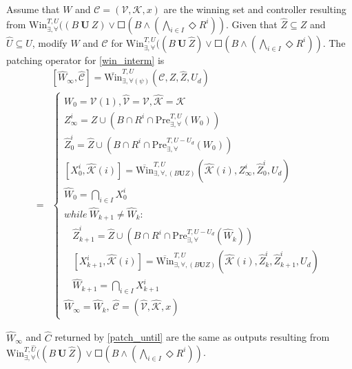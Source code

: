 Assume that $ W $ and $ \mathcal{C}=(\mathcal{V},\mathcal{K},x) $ are the winning set and controller resulting from $\text{Win}_{\exists,\forall}^{T,U}((B\mathbf{\ U\ }Z)\vee \Square(B\wedge (\bigwedge_{i\in I} \Diamond R^i)) $. Given that $ \widehat{Z}\subseteq Z $ and $ \widehat{U}\subseteq U $, modify $ W $ and $ \mathcal{C} $ for $\text{Win}_{\exists,\forall}^{T,U}((B\mathbf{\ U\ }\widehat{Z})\vee \Square(B\wedge (\bigwedge_{i\in I} \Diamond R^i)) $. The patching operator for \eqref{win_interm} is 
\begin{align}
&[\widehat{W}_{\infty},\widehat{\mathcal{C}}]=\overline{\text{Win}}^{T, U}_{\exists,\forall (\psi)} (\mathcal{C},Z,\widehat{Z},U_d)\\
=&\begin{cases}
W_0 = \mathcal{V}(1),\widehat{\mathcal{V}}=\mathcal{V},\widehat{\mathcal{K}}=\mathcal{K}\\
Z_{\infty}^i = Z\cup (B\cap R^i\cap \text{Pre}_{\exists, \forall}^{T,U}(W_0))\\
\widehat{Z}_{0}^i = \widehat{Z}\cup (B\cap R^i\cap \text{Pre}_{\exists, \forall}^{T,U-U_d}(W_0))\\
[X^i_0,\widehat{\mathcal{K}}(i)] = \overline{\text{Win}}^{T,U}_{\exists,\forall, (B\mathbf{U}Z)}(\widehat{\mathcal{K}}(i),Z_\infty^i,\widehat{Z}_0^i, U_d)\\
\widehat{W}_{0} = \bigcap_{i\in I} X^i_0\\
while\ \widehat{W}_{k+1}\not=\widehat{W}_k:\\
\ \ \ \ \widehat{Z}_{k+1}^i = \widehat{Z} \cup (B\cap R^i\cap \text{Pre}_{\exists, \forall}^{T,U-U_d}(\widehat{W}_k))\\
\ \ \ \ [X^i_{k+1},\widehat{\mathcal{K}}(i)]=\overline{\text{Win}}^{T,U}_{\exists,\forall,(B\mathbf{U}Z)}(\widehat{\mathcal{K}}(i),\widehat{Z}_k^i,\widehat{Z}_{k+1}^i, U_d)\\
\ \ \ \ \widehat{W}_{k+1} = \bigcap_{i\in I} X^i_{k+1}\\
\widehat{W}_\infty = \widehat{W}_k,\ \widehat{\mathcal{C}}=(\widehat{\mathcal{V}},\widehat{\mathcal{K}},x)
\end{cases}\label{patch_interm}
\end{align}

\begin{theorem}
	$ \widehat{W}_\infty $ and $ \widehat{C} $ returned by \eqref{patch_until} are the same as outputs resulting from $\text{Win}_{\exists,\forall}^{T,\widehat{U}}((B\mathbf{\ U\ }\widehat{Z})\vee \Square(B\wedge (\bigwedge_{i\in I} \Diamond R^i)) $. \label{thm:interm}	
\end{theorem}


